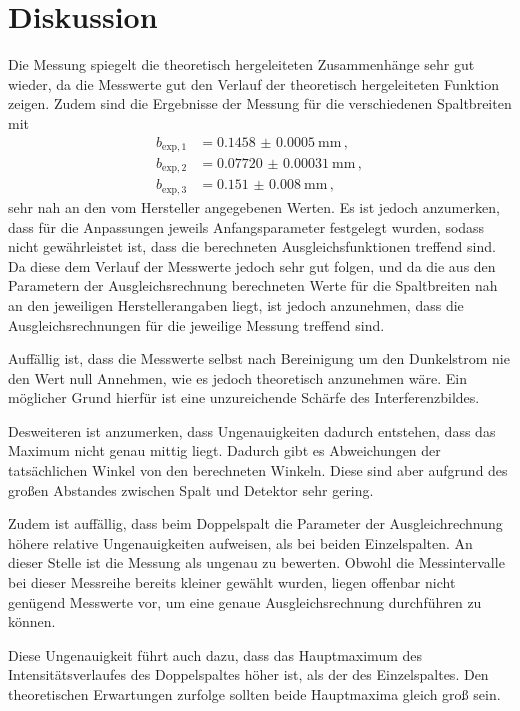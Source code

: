 \section{Diskussion}
\label{sec:Diskussion}
Die Messung spiegelt die theoretisch hergeleiteten Zusammenhänge sehr gut wieder,
da die Messwerte gut den Verlauf der theoretisch hergeleiteten Funktion zeigen. Zudem
sind die Ergebnisse der Messung für die verschiedenen Spaltbreiten mit
\begin{align*}
  b_{\text{exp},1}&=\SI{0.1458(00005)}{\milli\meter} \,, \\
  b_{\text{exp},2}&=\SI{0.07720(000031)}{\milli\meter} \,,\\
  b_{\text{exp},3}&=\SI{0.151(0008)}{\milli\meter} \,,
\end{align*}
sehr nah an den vom Hersteller angegebenen Werten.
Es ist jedoch anzumerken, dass für die Anpassungen jeweils Anfangsparameter festgelegt
wurden, sodass nicht gewährleistet ist, dass die berechneten Ausgleichsfunktionen
treffend sind. Da diese dem Verlauf der Messwerte jedoch sehr gut folgen, und da
die aus den Parametern der Ausgleichsrechnung berechneten Werte für die Spaltbreiten
nah an den jeweiligen Herstellerangaben liegt, ist jedoch
anzunehmen, dass die Ausgleichsrechnungen für die jeweilige Messung treffend sind.

Auffällig ist, dass die Messwerte selbst nach Bereinigung um den Dunkelstrom nie
den Wert null Annehmen, wie es jedoch  theoretisch anzunehmen wäre. Ein möglicher Grund
hierfür ist eine unzureichende Schärfe des Interferenzbildes.

Desweiteren ist anzumerken, dass Ungenauigkeiten dadurch entstehen, dass das Maximum
nicht genau mittig liegt. Dadurch gibt es Abweichungen der tatsächlichen Winkel
von den berechneten Winkeln. Diese sind aber aufgrund des großen Abstandes zwischen
Spalt und Detektor sehr gering.

Zudem ist auffällig, dass beim Doppelspalt die Parameter der Ausgleichrechnung höhere
relative Ungenauigkeiten aufweisen, als bei beiden Einzelspalten. 
An dieser Stelle ist die Messung als ungenau zu bewerten. Obwohl die Messintervalle
bei dieser Messreihe bereits kleiner gewählt wurden, liegen offenbar nicht genügend Messwerte
vor, um eine genaue Ausgleichsrechnung durchführen zu können.

Diese Ungenauigkeit führt auch dazu, dass das Hauptmaximum des Intensitätsverlaufes des
Doppelspaltes höher ist, als der des Einzelspaltes. Den theoretischen Erwartungen zurfolge
sollten beide Hauptmaxima gleich groß sein.



